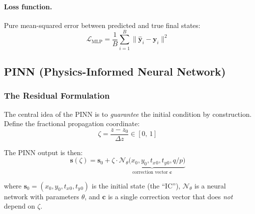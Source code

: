 \documentclass[11pt,a4paper]{article}
\newcommand{\zfrac}{\zeta}
\newcommand{\dz}{\Delta z}
\newcommand{\qop}{q/p}
\newcommand{\vstate}{\mathbf{s}}
\newcommand{\vc}{\mathbf{c}}
\newcommand{\tx}{t_x}
\newcommand{\ty}{t_y}
\begin{document}
\paragraph{Loss function.}
Pure mean-squared error between predicted and true final states:
\begin{equation}\label{eq:mlp_loss}
  \mathcal{L}_{\mathrm{MLP}} =
  \frac{1}{B}\sum_{i=1}^{B}\bigl\|\hat{\mathbf{y}}_i - \mathbf{y}_i\bigr\|^2
\end{equation}

\subsection{PINN (Physics-Informed Neural Network)}\label{sec:pinn}

\subsubsection{The Residual Formulation}\label{sec:residual}

The central idea of the PINN is to \emph{guarantee} the initial condition
by construction.  Define the fractional propagation coordinate:
\begin{equation}\label{eq:zfrac}
  \zfrac = \frac{z - z_0}{\dz} \in [0,\,1]
\end{equation}

The PINN output is then:
\begin{equation}\label{eq:pinn_residual}
  \boxed{\;
    \vstate(\zfrac) = \vstate_0 + \zfrac \cdot
    \underbrace{\mathcal{N}_\theta\!\bigl(x_0, y_0, \tx{}_0, \ty{}_0,
    \qop\bigr)}_{\text{correction vector }\vc}
  \;}
\end{equation}

where $\vstate_0 = (x_0, y_0, \tx{}_0, \ty{}_0)$ is the initial state (the
``IC''), $\mathcal{N}_\theta$ is a neural network with parameters $\theta$,
and $\vc$ is a single correction vector that does \emph{not} depend on $\zfrac$.
\end{document}
